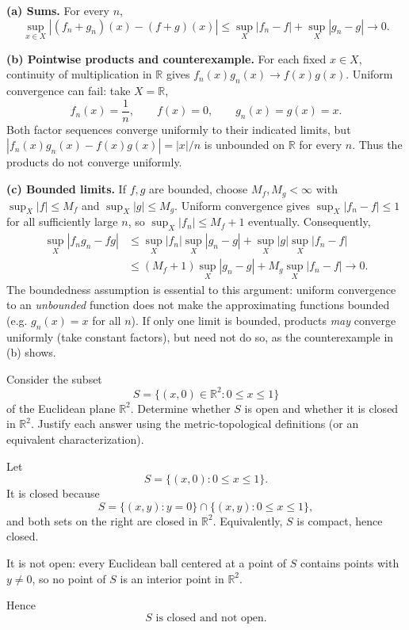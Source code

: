 \begin{solution}
\textbf{(a) Sums.} For every $n$,
\[
\sup_{x\in X}|(f_n+g_n)(x)-(f+g)(x)|
\le \sup_X|f_n-f|+\sup_X|g_n-g|\longrightarrow0.
\]

\par\medskip\noindent\textbf{(b) Pointwise products and counterexample.}
For each fixed $x\in X$, continuity of multiplication in $\mathbb R$ gives
$f_n(x)g_n(x)\to f(x)g(x)$.
Uniform convergence can fail: take $X=\mathbb R$,
\[
f_n(x)=\frac1n,\qquad f(x)=0,\qquad
 g_n(x)=g(x)=x.
\]
Both factor sequences converge uniformly to their indicated limits, but
$|f_n(x)g_n(x)-f(x)g(x)|=|x|/n$ is unbounded on $\mathbb R$ for every $n$.
Thus the products do not converge uniformly.

\par\medskip\noindent\textbf{(c) Bounded limits.}
If $f,g$ are bounded, choose $M_f,M_g<\infty$ with
$\sup_X|f|\le M_f$ and $\sup_X|g|\le M_g$.
Uniform convergence gives $\sup_X|f_n-f|\le1$ for all sufficiently large $n$, so
$\sup_X|f_n|\le M_f+1$ eventually. Consequently,
\[
\begin{aligned}
\sup_X|f_ng_n-fg|
&\le \sup_X|f_n|\sup_X|g_n-g|+\sup_X|g|\sup_X|f_n-f|\\
&\le (M_f+1)\sup_X|g_n-g|+M_g\sup_X|f_n-f|\longrightarrow0.
\end{aligned}
\]
The boundedness assumption is essential to this argument: uniform convergence to
an \emph{unbounded} function does not make the approximating functions bounded
(e.g. $g_n(x)=x$ for all $n$). If only one limit is bounded, products
\emph{may} converge uniformly (take constant factors), but need not do so,
as the counterexample in (b) shows.
\end{solution}

\begin{problem}[CP-IV-0030]
\label{prob:cp-iv-0030}
Consider the subset
\[
S=\{(x,0)\in\mathbb R^2:0\le x\le1\}
\]
of the Euclidean plane $\mathbb R^2$. Determine whether $S$ is open and
whether it is closed in $\mathbb R^2$. Justify each answer using the
metric-topological definitions (or an equivalent characterization).
\end{problem}

\begin{solution}
Let
\[
S=\{(x,0):0\le x\le1\}.
\]
It is closed because
\[
S
=
\{(x,y):y=0\}
\cap
\{(x,y):0\le x\le1\},
\]
and both sets on the right are closed in \(\mathbb R^2\). Equivalently, \(S\) is compact, hence closed.

It is not open: every Euclidean ball centered at a point of \(S\) contains points with \(y\neq0\), so no point of \(S\) is an interior point in \(\mathbb R^2\).

Hence
\[
\boxed{S\text{ is closed and not open}.}
\]
\end{solution}


